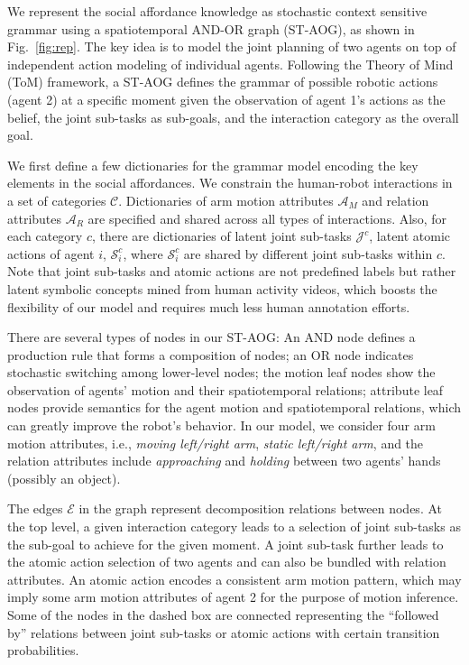 \documentclass[letterpaper, 10 pt, conference]{ieeeconf}  %
\begin{document}
   
   
   We represent the social affordance knowledge as stochastic context sensitive grammar using a spatiotemporal AND-OR graph (ST-AOG), as shown in Fig.~\ref{fig:rep}. The key idea is to model the joint planning of two agents on top of independent action modeling of individual agents. Following the Theory of Mind (ToM) framework, a ST-AOG defines the grammar of possible robotic actions (agent 2) at a specific moment given the observation of agent 1's actions as the belief, the joint sub-tasks as sub-goals, and the interaction category as the overall goal.%
   
   We first define a few dictionaries for the grammar model encoding the key elements in the social affordances. We constrain the human-robot interactions in a set of categories $\mathcal{C}$. Dictionaries of arm motion attributes $\mathcal{A}_M$ and relation attributes $\mathcal{A}_R$ are specified and shared across all types of interactions. Also, for each category $c$, there are dictionaries of latent joint sub-tasks $\mathcal{J}^c$, latent atomic actions of agent $i$, $\mathcal{S}_i^c$, where $\mathcal{S}_i^c$ are shared by different joint sub-tasks within $c$. Note that joint sub-tasks and atomic actions are not predefined labels but rather latent symbolic concepts mined from human activity videos, which boosts the flexibility of our model and requires much less human annotation efforts.
   
   There are several types of nodes in our ST-AOG: An AND node defines a production rule that forms a composition of nodes; an OR node indicates stochastic switching among lower-level nodes; the motion leaf nodes show the observation of agents' motion and their spatiotemporal relations; attribute leaf nodes provide semantics for the agent motion and spatiotemporal relations, which can greatly improve the robot's behavior. In our model, we consider four arm motion attributes, i.e., \textit{moving left/right arm}, \textit{static left/right arm}, and the relation attributes include \textit{approaching} and \textit{holding} between two agents' hands (possibly an object).
   
   The edges $\mathcal{E}$ in the graph represent decomposition relations between nodes. At the top level, a given interaction category leads to a selection of joint sub-tasks as the sub-goal to achieve for the given moment. A joint sub-task further leads to the atomic action selection of two agents and can also be bundled with relation attributes. An atomic action encodes a consistent arm motion pattern, which may imply some arm motion attributes of agent 2 for the purpose of motion inference. Some of the nodes in the dashed box are connected representing the ``followed by'' relations between joint sub-tasks or atomic actions with certain transition probabilities.%
   
\end{document}
